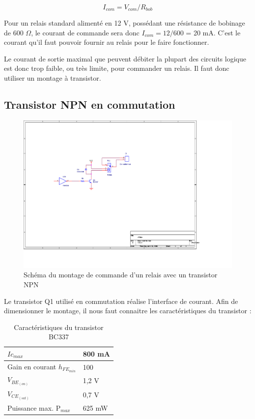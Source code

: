 \documentclass[a4paper]{article}
\begin{document}
\[I_{com} = V_{com}/R_{bob}\]

Pour un relais standard alimenté en 12 V, possédant une résistance de bobinage de 600 $\Omega$, le courant de commande sera donc $I_{com} = 12/600$ = 20 mA. C'est le courant qu'il faut pouvoir fournir au relais pour le faire fonctionner.

Le courant de sortie maximal que peuvent débiter la plupart des circuits logique est donc trop faible, ou très limite, pour commander un relais. Il faut donc utiliser un montage à transistor.

\subsection{Transistor NPN en commutation}

\begin{figure}[H]
	\centering
	\includegraphics[scale=1.00]{Images/Montage_commande_relais}
	\caption{Schéma du montage de commande d'un relais avec un transistor NPN
		\label{Montage_commande_relais}}
\end{figure}

Le transistor Q1 utilisé en commutation réalise l'interface de courant. Afin de dimensionner le montage, il nous faut connaitre les caractéristiques du transistor :

\begin{table}[H]
	\centering
	\begin{tabular}{|l|l|}\hline
			$Ic_{max}$ & 800 mA\\\hline
			Gain en courant $h_{FE_{min}}$ & 100\\\hline
			$V_{BE_{(on)}}$ & 1,2 V\\\hline
			$V_{CE_{(sat)}}$ & 0,7 V\\\hline
			Puissance max. P$_{max}$ & 625 mW\\\hline
	\end{tabular}
	\caption{Caractéristiques du transistor BC337 \cite{BC337}
		\label{Caracteristiques_du_transistor_BC337}}
\end{table}
\end{document}
